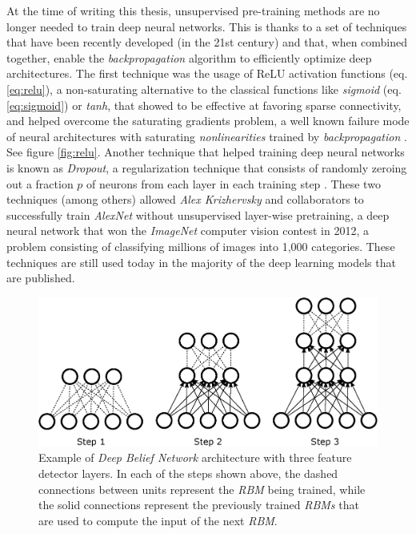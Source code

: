 At the time of writing this thesis, unsupervised pre-training methods are no longer needed to train deep neural networks. This is thanks to a set of techniques that have been recently developed (in the 21st century) and that, when combined together, enable the \textit{backpropagation} algorithm to efficiently optimize deep architectures. The first technique was the usage of ReLU activation functions \cite{nair2010} (eq. \ref{eq:relu}), a non-saturating alternative to the classical functions like \textit{sigmoid} (eq. \ref{eq:sigmoid}) or \textit{tanh}, that showed to be effective at favoring sparse connectivity, and helped overcome the saturating gradients problem, a well known failure mode of neural architectures with saturating \textit{nonlinearities} trained by \textit{backpropagation} \cite{Hong2019}. See figure \ref{fig:relu}. Another technique that helped training deep neural networks is known as \textit{Dropout}, a regularization technique that consists of randomly zeroing out a fraction $p$ of neurons from each layer in each training step \cite{hinton2012, srivastava2014}. These two techniques (among others) allowed \textit{Alex Krizhervsky} and collaborators to successfully train \textit{AlexNet} without unsupervised layer-wise pretraining, a deep neural network that won the \textit{ImageNet} \cite{deng2009imagenet} computer vision contest in 2012, a problem consisting of classifying millions of images into 1,000 categories. These techniques are still used today in the majority of the deep learning models that are published. 

\begin{figure}
	\centering
	\includegraphics[width=0.7\linewidth]{chapter2/images/dbn}
	\caption{Example of \textit{Deep Belief Network} architecture with three feature detector layers. In each of the steps shown above, the dashed connections between units represent the \textit{RBM} being trained, while the solid connections represent the previously trained \textit{RBMs} that are used to compute the input of the next \textit{RBM}.}
	\label{fig:dbn}
\end{figure}


